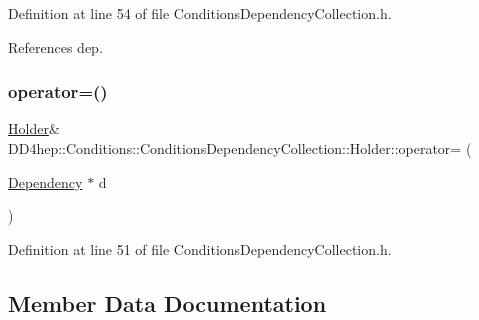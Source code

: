 Definition at line 54 of file Conditions\+Dependency\+Collection.\+h.



References dep.

\hypertarget{struct_d_d4hep_1_1_conditions_1_1_conditions_dependency_collection_1_1_holder_a2a2c20e8415f2366ff083542b73a225a}{}\label{struct_d_d4hep_1_1_conditions_1_1_conditions_dependency_collection_1_1_holder_a2a2c20e8415f2366ff083542b73a225a} 
\subsubsection{\texorpdfstring{operator=()}{operator=()}}
{\footnotesize\ttfamily \hyperlink{struct_d_d4hep_1_1_conditions_1_1_conditions_dependency_collection_1_1_holder}{Holder}\& D\+D4hep\+::\+Conditions\+::\+Conditions\+Dependency\+Collection\+::\+Holder\+::operator= (\begin{DoxyParamCaption}\item[{\hyperlink{class_d_d4hep_1_1_conditions_1_1_conditions_dependency_collection_a87252585d3e17ae82813c039b1b47e8a}{Dependency} $\ast$}]{d }\end{DoxyParamCaption})\hspace{0.3cm}{\ttfamily [inline]}}



Definition at line 51 of file Conditions\+Dependency\+Collection.\+h.



\subsection{Member Data Documentation}
\hypertarget{struct_d_d4hep_1_1_conditions_1_1_conditions_dependency_collection_1_1_holder_a958102c9c47e86d3f479021dd1e570f6}{}\label{struct_d_d4hep_1_1_conditions_1_1_conditions_dependency_collection_1_1_holder_a958102c9c47e86d3f479021dd1e570f6} 
